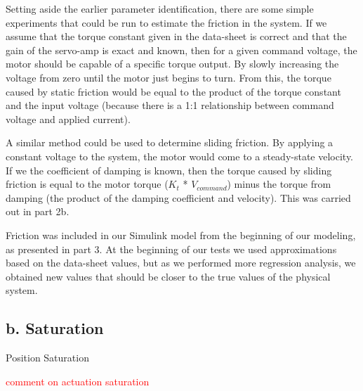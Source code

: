 \documentclass{article}
\newcommand{\xxx}[1]{\textcolor{red}{#1}}
\theoremstyle{plain}
\theoremstyle{definition}
\theoremstyle{remark}
\begin{document}
\vspace{3 mm}
Setting aside the earlier parameter identification, there are some simple experiments that could be run to estimate the friction in the system. If we assume that the torque constant given in the data-sheet is correct and that the gain of the servo-amp is exact and known, then for a given command voltage, the motor should be capable of a specific torque output. By slowly increasing the voltage from zero until the motor just begins to turn. From this, the torque caused by static friction would be equal to the product of the torque constant and the input voltage (because there is a 1:1 relationship between command voltage and applied current). 

\vspace{3 mm}
A similar method could be used to determine sliding friction. By applying a constant voltage to the system, the motor would come to a steady-state velocity. If we the coefficient of damping is known, then the torque caused by sliding friction is equal to the motor torque ($K_{t}$ * $V_{command}$) minus the torque from damping (the product of the damping coefficient and velocity). This was carried out in part 2b.

\vspace{3 mm}
Friction was included in our Simulink model from the beginning of our modeling, as presented in part 3. At the beginning of our tests we used approximations based on the data-sheet values, but as we performed more regression analysis, we obtained new values that should be closer to the true values of the physical system. 

\subsection*{b. Saturation}

Position Saturation

\xxx{comment on actuation saturation}
\end{document}
